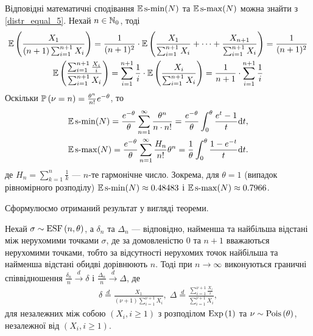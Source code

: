Відповідні математичні сподівання $\E\smin(N)$ та $\E\smax(N)$ можна знайти з \eqref{distr_equal_5}. 
Нехай $n \in \N_0$, тоді
\begin{gather*}
    \E\left(
        \frac{X_1}{(n+1)\sum_{i=1}^{n+1} X_i}
    \right) = \frac{1}{(n+1)^2}\cdot \E \left(
        \frac{X_1}{\sum_{i=1}^{n+1} X_i} + \dots + \frac{X_{n+1}}{\sum_{i=1}^{n+1} X_i}
    \right) = \frac{1}{(n+1)^2} \\
    \E\left(
        \frac{\sum_{i=1}^{n+1} \frac{X_i}{i}}{\sum_{i=1}^{n+1} X_i}
    \right) = 
    \sum_{i=1}^{n+1} \frac{1}{i} \cdot \E\left(\frac{X_i}{\sum_{i=1}^{n+1} X_i}\right) = 
    \frac{1}{n+1} \cdot \sum_{i=1}^{n+1} \frac{1}{i}
\end{gather*}
Оскільки $\P{\nu = n} = \frac{\theta^n}{n!}e^{-\theta}$, то
\begin{gather*}
    \E\smin(N) = \frac{e^{-\theta}}{\theta}\sum_{n=1}^{\infty} \frac{\theta^n}{n\cdot n!} = 
    \frac{e^{-\theta}}{\theta}\int_0^\theta \frac{e^t-1}{t}\d t, \\
    \E\smax(N) = \frac{e^{-\theta}}{\theta}\sum_{n=1}^{\infty} \frac{H_n}{n!} \theta^n = 
    \frac{1}{\theta} \int_0^{\theta} \frac{1-e^{-t}}{t}\d t.
\end{gather*}
де $H_n = \sum_{k=1}^n \frac{1}{k}$ --- $n$-те гармонічне число.
Зокрема, для $\theta = 1$ (випадок рівномірного розподілу) 
$\E\smin(N) \approx 0.48483$ і $\E\smax(N) \approx 0.7966$.

Сформулюємо отриманий результат у вигляді теореми.
\begin{theorem}
    Нехай $\sigma \sim \ESF{n, \theta}$, а $\delta_n$ та $\Delta_n$ ---
    відповідно, найменша та найбільша відстані між нерухомими точками $\sigma$,
    де за домовленістю $0$ та $n+1$ вважаються нерухомими точками, тобто
    за відсутності нерухомих точок найбільша та найменша відстані обидві дорівнюють $n$.
    Тоді при $n\to\infty$ виконуються граничні
    співвідношення
    $\frac{\delta_n}{n} \overset{d}{\longrightarrow} \delta$ і 
    $\frac{\Delta_n}{n} \overset{d}{\longrightarrow} \Delta$, де
    \begin{gather}
        \delta \overset{d}{=}
        \frac{X_1}{(\nu+1)\sum_{i=1}^{\nu+1} X_i}, \;
        \Delta \overset{d}{=} 
        \frac{\sum_{i=1}^{\nu+1} \frac{X_i}{i}}{\sum_{i=1}^{\nu+1} X_i},
    \end{gather}
    для незалежних між собою $\left(X_i, i \geq 1\right)$
    з розподілом $\Exp{1}$ та $\nu \sim \Poiss{\theta}$,
    незалежної від $\left(X_i, i \geq 1\right)$.
\end{theorem}